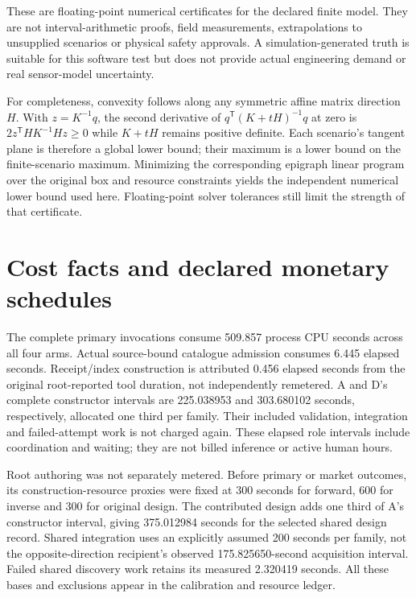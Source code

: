 \documentclass[11pt,letterpaper]{article}
\begin{document}
These are floating-point numerical certificates for the declared finite model. They are not interval-arithmetic proofs, field measurements, extrapolations to unsupplied scenarios or physical safety approvals. A simulation-generated truth is suitable for this software test but does not provide actual engineering demand or real sensor-model uncertainty.

For completeness, convexity follows along any symmetric affine matrix direction $H$. With $z=K^{-1}q$, the second derivative of $q^\mathsf{T}(K+tH)^{-1}q$ at zero is $2z^\mathsf{T}HK^{-1}Hz\geq0$ while $K+tH$ remains positive definite. Each scenario's tangent plane is therefore a global lower bound; their maximum is a lower bound on the finite-scenario maximum. Minimizing the corresponding epigraph linear program over the original box and resource constraints yields the independent numerical lower bound used here. Floating-point solver tolerances still limit the strength of that certificate.

\section{Cost facts and declared monetary schedules}

The complete primary invocations consume 509.857 process CPU seconds across all four arms. Actual source-bound catalogue admission consumes 6.445 elapsed seconds. Receipt/index construction is attributed 0.456 elapsed seconds from the original root-reported tool duration, not independently remetered. A and D's complete constructor intervals are 225.038953 and 303.680102 seconds, respectively, allocated one third per family. Their included validation, integration and failed-attempt work is not charged again. These elapsed role intervals include coordination and waiting; they are not billed inference or active human hours.

Root authoring was not separately metered. Before primary or market outcomes, its construction-resource proxies were fixed at 300 seconds for forward, 600 for inverse and 300 for original design. The contributed design adds one third of A's constructor interval, giving 375.012984 seconds for the selected shared design record. Shared integration uses an explicitly assumed 200 seconds per family, not the opposite-direction recipient's observed 175.825650-second acquisition interval. Failed shared discovery work retains its measured 2.320419 seconds. All these bases and exclusions appear in the calibration and resource ledger.
\end{document}
